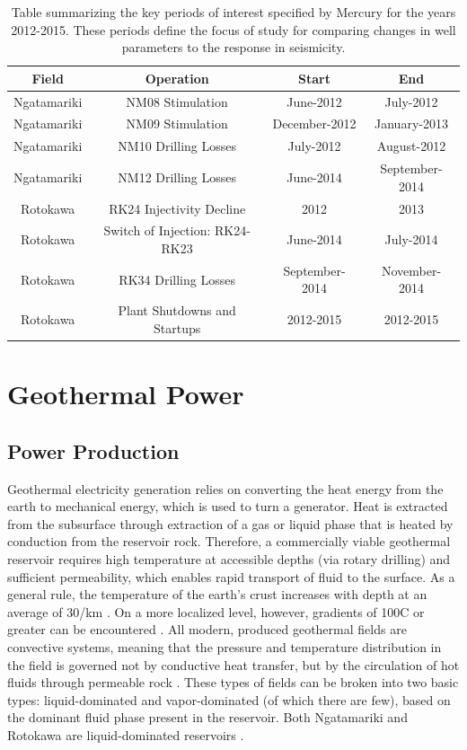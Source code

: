 \begin{table}
\begin{tabular}{cccc}
    {Field} & {Operation} & {Start} & {End}\\ \midrule
    Ngatamariki & NM08 Stimulation & June-2012 & July-2012\\
    Ngatamariki & NM09 Stimulation & December-2012 & January-2013\\
    Ngatamariki & NM10 Drilling Losses & July-2012 & August-2012\\
    Ngatamariki & NM12 Drilling Losses  & June-2014 & September-2014\\
    Rotokawa & RK24 Injectivity Decline & 2012 & 2013\\
    Rotokawa & Switch of Injection: RK24-RK23 & June-2014 & July-2014\\
    Rotokawa & RK34 Drilling Losses & September-2014 & November-2014\\
    Rotokawa & Plant Shutdowns and Startups & 2012-2015 & 2012-2015\\
\end{tabular}
\caption{{Table summarizing the key periods of interest specified by Mercury for the years 2012-2015. These periods define the focus of study for comparing
changes in well parameters to the response in seismicity.}}
\label{table:objectives}
\end{table}

\section{Geothermal Power}
\subsection{Power Production}
Geothermal electricity generation relies on converting the heat energy from the earth to mechanical energy, which is used to turn a generator. Heat is extracted from the subsurface through extraction of a gas or liquid phase that is heated by conduction from the reservoir rock. Therefore, a commercially viable geothermal reservoir requires high temperature at accessible depths (via rotary drilling) and sufficient permeability, which enables rapid transport of fluid to the surface. As a general rule, the temperature of the earth's crust increases with depth at an average of 30\slash{km} \citep{Grant_2011}. On a more localized level, however, gradients of 100\textdegree C or greater can be encountered \citep{Grant_2011}. All modern, produced geothermal fields are convective systems, meaning that the pressure and temperature distribution in the field is governed not by conductive heat transfer, but by the circulation of hot fluids through permeable rock \citep{Grant_2011}. These types of fields can be broken into two basic types: liquid-dominated and vapor-dominated (of which there are few), based on the dominant fluid phase present in the reservoir. Both Ngatamariki and Rotokawa are liquid-dominated reservoirs \citep{McNamara_2016,Chambefort_2016}.

